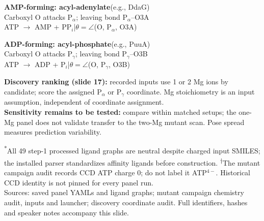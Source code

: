\documentclass{article}
\begin{document}
\begin{minipage}[t]{0.48\textwidth}
\colorbox{tint}{\parbox{0.95\linewidth}{\fontsize{14}{17}\selectfont
\textbf{AMP-forming: acyl-adenylate}\quad (e.g., DdaG)\\
Carboxyl O attacks P$_\alpha$; leaving bond P$_\alpha$--O3A\\
ATP $\rightarrow$ AMP + PP$_i$\quad |\quad $\theta=\angle$(O, P$_\alpha$, O3A)}}
\end{minipage}\hfill
\begin{minipage}[t]{0.48\textwidth}
\colorbox{tint}{\parbox{0.95\linewidth}{\fontsize{14}{17}\selectfont
\textbf{ADP-forming: acyl-phosphate}\quad (e.g., PuuA)\\
Carboxyl O attacks P$_\gamma$; leaving bond P$_\gamma$--O3B\\
ATP $\rightarrow$ ADP + P$_i$\quad |\quad $\theta=\angle$(O, P$_\gamma$, O3B)}}
\end{minipage}
\vspace{8pt}\par
{\fontsize{12}{14.2}\selectfont
\textbf{Discovery ranking (slide 17):} recorded inputs use 1 or 2 Mg ions by candidate; score the assigned P$_\alpha$ or P$_\gamma$ coordinate. Mg stoichiometry is an input assumption, independent of coordinate assignment.\\[3pt]
\textbf{Sensitivity remains to be tested:} compare within matched setups; the one-Mg panel does not validate transfer to the two-Mg mutant scan. Pose spread measures prediction variability.}
\vspace{6pt}\par
{\fontsize{10}{11.8}\selectfont\color{muted}
\textsuperscript{*}All 49 step-1 processed ligand graphs are neutral despite charged input SMILES; the installed parser standardizes affinity ligands before construction.
\textsuperscript{\ensuremath{\dagger}}The mutant campaign audit records CCD ATP charge 0; do not label it ATP$^{4-}$. Historical CCD identity is not pinned for every panel run.\\
Sources: saved panel YAMLs and ligand graphs; mutant campaign chemistry audit, inputs and launcher; discovery coordinate audit. Full identifiers, hashes and speaker notes accompany this slide.}
\end{document}
